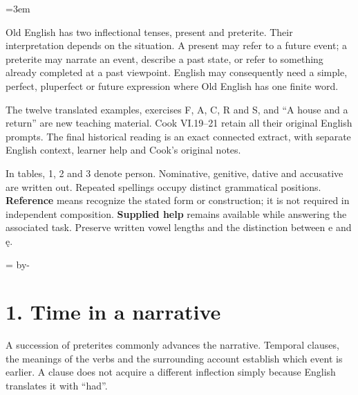 \BookRecto
\begingroup
\renewcommand{\runningtitle}{Unit 12. Tense, sequence, and voice}
\emergencystretch=3em
\newcommand{\itempara}[2]{\par\addvspace{3pt}\noindent\hangindent=1.8em\hangafter=1\makebox[1.8em][l]{#1.}#2\par}
\newcommand{\reserve}[1]{\par\penalty-100\begingroup\dimen0=\pagegoal\advance\dimen0 by-\pagetotal\ifdim\dimen0<#1\newpage\fi\endgroup}

\raggedright
{}

Old English has two inflectional tenses, present and preterite. Their interpretation depends on the situation. A present may refer to a future event; a preterite may narrate an event, describe a past state, or refer to something already completed at a past viewpoint. English may consequently need a simple, perfect, pluperfect or future expression where Old English has one finite word.

The twelve translated examples, exercises F, A, C, R and S, and “A house and a return” are new teaching material. Cook VI.19–21 retain all their original English prompts. The final historical reading is an exact connected extract, with separate English context, learner help and Cook’s original notes.

In tables, 1, 2 and 3 denote person. Nominative, genitive, dative and accusative are written out. Repeated spellings occupy distinct grammatical positions. \textbf{Reference} means recognize the stated form or construction; it is not required in independent composition. \textbf{Supplied help} remains available while answering the associated task. Preserve written vowel lengths and the distinction between e and ę.

\reserve{7\baselineskip}
\section*{1. Time in a narrative}

A succession of preterites commonly advances the narrative. Temporal clauses, the meanings of the verbs and the surrounding account establish which event is earlier. A clause does not acquire a different inflection simply because English translates it with “had”.

